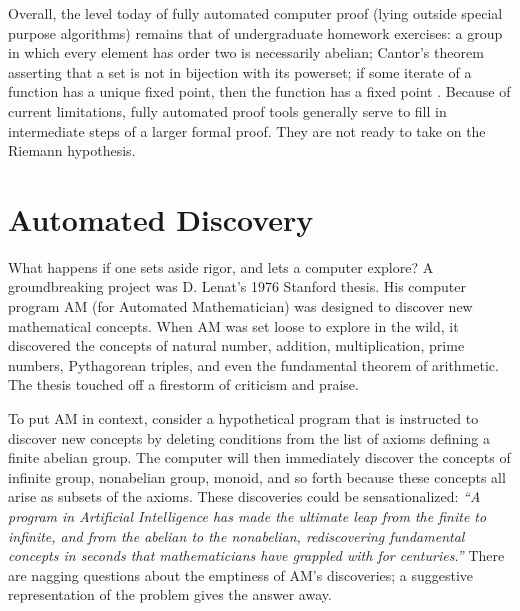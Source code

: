 \documentclass{llncs}
\begin{document}
\bigskip


Overall, the level today of fully automated computer proof (lying outside
special purpose algorithms) remains that of undergraduate
homework exercises: a group in which every element has order two is necessarily abelian; Cantor's theorem asserting that a set is not in bijection with its powerset; 
%
if some iterate of a function has a unique fixed point, then
the function has a fixed point \cite{TPS}.
Because of current limitations, fully automated proof tools
generally serve to fill in  intermediate steps of a
larger formal proof.  They are not ready to take on the Riemann hypothesis.


\section{Automated Discovery}

What happens if one sets aside rigor, and lets a computer explore?
A groundbreaking project was D. Lenat's 1976 Stanford thesis.
His computer program AM (for Automated Mathematician) was
designed to discover new mathematical concepts.  When AM was set loose to explore in the wild, it discovered the concepts of natural number, addition, multiplication, prime numbers, Pythagorean triples, and even the fundamental theorem of arithmetic.
The thesis touched off a firestorm of criticism and praise.

To put AM in context, consider a hypothetical program that is instructed to discover new concepts by deleting conditions
from the list of axioms defining a finite abelian group.  The computer will then immediately discover the concepts
of infinite  group,  nonabelian group,  monoid, and so forth because these concepts all
arise as subsets of the axioms.  These discoveries could be sensationalized:
{\it ``A program in Artificial Intelligence 
has made the ultimate leap from the finite to infinite, and from the abelian to the nonabelian,
rediscovering fundamental concepts in seconds that mathematicians have grappled with for centuries.''}
There are nagging questions about the emptiness of AM's discoveries; a
suggestive representation of the problem gives the answer away.
\end{document}
